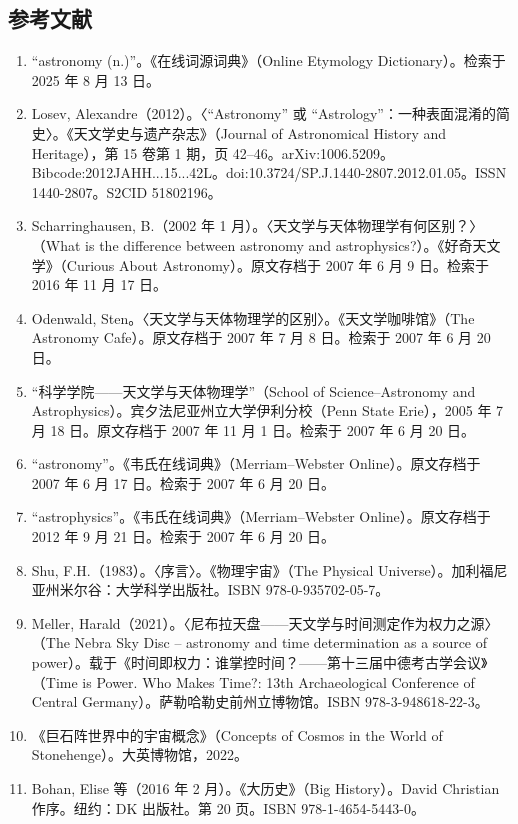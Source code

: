 \subsection{参考文献}
\begin{enumerate}
  \item “astronomy (n.)”。《在线词源词典》（Online Etymology Dictionary）。检索于 2025 年 8 月 13 日。
  \item Losev, Alexandre（2012）。〈“Astronomy” 或 “Astrology”：一种表面混淆的简史〉。《天文学史与遗产杂志》（Journal of Astronomical History and Heritage），第 15 卷第 1 期，页 42–46。arXiv:1006.5209。Bibcode:2012JAHH...15...42L。doi:10.3724/SP.J.1440-2807.2012.01.05。ISSN 1440-2807。S2CID 51802196。
  \item Scharringhausen, B.（2002 年 1 月）。〈天文学与天体物理学有何区别？〉（What is the difference between astronomy and astrophysics?）。《好奇天文学》（Curious About Astronomy）。原文存档于 2007 年 6 月 9 日。检索于 2016 年 11 月 17 日。
  \item Odenwald, Sten。〈天文学与天体物理学的区别〉。《天文学咖啡馆》（The Astronomy Cafe）。原文存档于 2007 年 7 月 8 日。检索于 2007 年 6 月 20 日。
  \item “科学学院——天文学与天体物理学”（School of Science–Astronomy and Astrophysics）。宾夕法尼亚州立大学伊利分校（Penn State Erie），2005 年 7 月 18 日。原文存档于 2007 年 11 月 1 日。检索于 2007 年 6 月 20 日。
  \item “astronomy”。《韦氏在线词典》（Merriam–Webster Online）。原文存档于 2007 年 6 月 17 日。检索于 2007 年 6 月 20 日。
  \item “astrophysics”。《韦氏在线词典》（Merriam–Webster Online）。原文存档于 2012 年 9 月 21 日。检索于 2007 年 6 月 20 日。
  \item Shu, F.H.（1983）。〈序言〉。《物理宇宙》（The Physical Universe）。加利福尼亚州米尔谷：大学科学出版社。ISBN 978-0-935702-05-7。
  \item Meller, Harald（2021）。〈尼布拉天盘——天文学与时间测定作为权力之源〉（The Nebra Sky Disc – astronomy and time determination as a source of power）。载于《时间即权力：谁掌控时间？——第十三届中德考古学会议》（Time is Power. Who Makes Time?: 13th Archaeological Conference of Central Germany）。萨勒哈勒史前州立博物馆。ISBN 978-3-948618-22-3。
  \item 《巨石阵世界中的宇宙概念》（Concepts of Cosmos in the World of Stonehenge）。大英博物馆，2022。
  \item Bohan, Elise 等（2016 年 2 月）。《大历史》（Big History）。David Christian 作序。纽约：DK 出版社。第 20 页。ISBN 978-1-4654-5443-0。

\end{enumerate}
